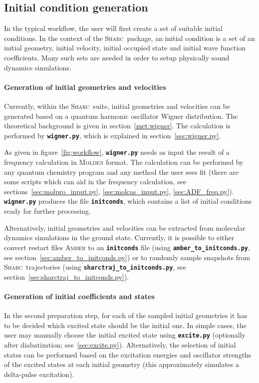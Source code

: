\documentclass[a4paper,10pt,DIV=15,openany]{scrbook}
\newcommand{\sharc}{\textsc{Sharc}}
\newcommand{\ttt}[1]{\textbf{\texttt{#1}}}
\begin{document}
\subsection{Initial condition generation}

In the typical workflow, the user will first create a set of suitable initial conditions. In the context of the \sharc\ package, an initial condition is a set of an initial geometry, initial velocity, initial occupied state and initial wave function coefficients. 
Many such sets are needed in order to setup physically sound dynamics simulations.

\paragraph{Generation of initial geometries and velocities}

Currently, within the \sharc\ suite, initial geometries and velocities can be generated based on a quantum harmonic oscillator Wigner distribution. The theoretical background is given in section~\ref{met:wigner}. The calculation is performed by \ttt{wigner.py}, which is explained in section~\ref{sec:wigner.py}. 

As given in figure~\ref{fig:workflow}, \ttt{wigner.py} needs as input the result of a frequency calculation in \textsc{Molden} format. The calculation can be performed by any quantum chemistry program and any method the user sees fit (there are some scripts which can aid in the frequency calculation, see sections~\ref{sec:molpro_input.py}, \ref{sec:molcas_input.py}, \ref{sec:ADF_freq.py}). 
\ttt{wigner.py} produces the file \ttt{initconds}, which contains a list of initial conditions ready for further processing.

Alternatively, initial geometries and velocities can be extracted from molecular dynamics simulations in the ground state.
Currently, it is possible to either convert restart files \textsc{Amber} to an \ttt{initconds} file (using \ttt{amber\_to\_initconds.py}, see section~\ref{sec:amber_to_initconds.py}) or to randomly sample snapshots from \sharc\ trajectories (using \ttt{sharctraj\_to\_initconds.py}, see section~\ref{sec:sharctraj_to_initconds.py}).

\paragraph{Generation of initial coefficients and states}

In the second preparation step, for each of the sampled initial geometries it has to be decided which excited state should be the initial one. In simple cases, the user may manually choose the initial excited state using \ttt{excite.py} (optionally after diabatization; see~\ref{sec:excite.py}). Alternatively, the selection of initial states can be performed based on the excitation energies and oscillator strengths of the excited states at each initial geometry (this approximately simulates a delta-pulse excitation). 
\end{document}
